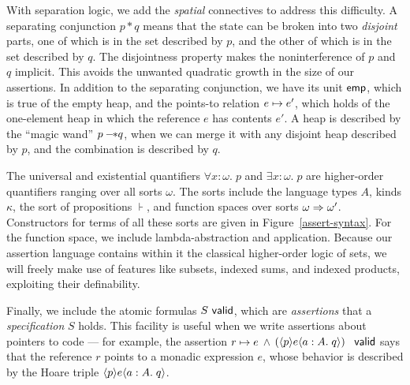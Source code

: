 \documentclass[preprint,natbib]{sigplanconf}
\begin{document}
With separation logic, we add the \emph{spatial} connectives to
address this difficulty. A separating conjunction $p * q$ means that
the state can be broken into two \emph{disjoint} parts, one of which
is in the set described by $p$, and the other of which is in the
set described by $q$. The disjointness property makes the
noninterference of $p$ and $q$ implicit. This avoids the unwanted
quadratic growth in the size of our assertions. In addition to the
separating conjunction, we have its unit $\mathsf{emp}$, which is true of the
empty heap, and the points-to relation $e \mapsto e'$, which holds
of the one-element heap in which the reference $e$ has contents
$e'$. A heap is described by the ``magic wand'' $p -\!\!* q$, when we
can merge it with any disjoint heap described by $p$, and the
combination is described by $q$.


The universal and existential quantifiers $\forall x:\omega.\;p$ and
$\exists x:\omega.\;p$ are higher-order quantifiers ranging over all
sorts $\omega$. The sorts include the language types $A$, kinds $\kappa$, the sort of
propositions $\assert$, and function spaces over sorts $\omega \Rightarrow
\omega'$. Constructors for terms of all these sorts are
given in Figure~\ref{assert-syntax}. For the function space, we
include lambda-abstraction and application. Because our assertion
language contains within it the classical higher-order logic of sets,
we will freely make use of features like subsets, indexed sums, and
indexed products, exploiting their definability.

Finally, we include the atomic formulas ${S}\mbox{\textsf{{ valid}}}$, which are
\emph{assertions} that a \emph{specification} $S$ holds. This facility
is useful when we write assertions about pointers to code --- for
example, the assertion $r \mapsto e$ $\land$
$(\langle{p}\rangle{e}\langle{a:A}.\;{q}\rangle)$ $\mbox{\textsf{{ valid}}}$ says that the reference $r$ points
to a monadic expression $e$, whose behavior is described by the Hoare
triple $\langle{p}\rangle{e}\langle{a:A}.\;{q}\rangle$.
\end{document}
